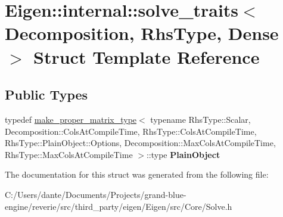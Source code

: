 \hypertarget{struct_eigen_1_1internal_1_1solve__traits_3_01_decomposition_00_01_rhs_type_00_01_dense_01_4}{}\section{Eigen\+::internal\+::solve\+\_\+traits$<$ Decomposition, Rhs\+Type, Dense $>$ Struct Template Reference}
\label{struct_eigen_1_1internal_1_1solve__traits_3_01_decomposition_00_01_rhs_type_00_01_dense_01_4}
\subsection*{Public Types}
\begin{DoxyCompactItemize}
\item 
\mbox{\label{struct_eigen_1_1internal_1_1solve__traits_3_01_decomposition_00_01_rhs_type_00_01_dense_01_4_a9d9672967a26b20182d5345b0d5cd4ef}} 
typedef \mbox{\hyperlink{class_eigen_1_1internal_1_1make__proper__matrix__type}{make\+\_\+proper\+\_\+matrix\+\_\+type}}$<$ typename Rhs\+Type\+::\+Scalar, Decomposition\+::\+Cols\+At\+Compile\+Time, Rhs\+Type\+::\+Cols\+At\+Compile\+Time, Rhs\+Type\+::\+Plain\+Object\+::\+Options, Decomposition\+::\+Max\+Cols\+At\+Compile\+Time, Rhs\+Type\+::\+Max\+Cols\+At\+Compile\+Time $>$\+::type {\bfseries Plain\+Object}
\end{DoxyCompactItemize}


The documentation for this struct was generated from the following file\+:\begin{DoxyCompactItemize}
\item 
C\+:/\+Users/dante/\+Documents/\+Projects/grand-\/blue-\/engine/reverie/src/third\+\_\+party/eigen/\+Eigen/src/\+Core/Solve.\+h\end{DoxyCompactItemize}
